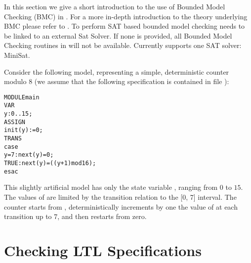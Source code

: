 In this section we give a short introduction to the use of Bounded Model
Checking (BMC) in \nusmv. For a more in-depth 
introduction to the theory underlying BMC please refer to \cite{BCCZ99}.
%
To perform SAT based bounded model checking \nusmv needs to be linked
to an external Sat Solver. If none is provided, all Bounded Model
Checking routines in \nusmv will not be available. Currently
\nusmv supports one SAT solver: MiniSat.


Consider the following model, representing a simple, deterministic
counter modulo $8$ (we assume that the following specification is
contained in file ):
\begin{alltt}
MODULE main
VAR 
  y : 0..15;
ASSIGN 
  init(y) := 0;
TRANS
  case
     y = 7 :  next(y) = 0; 
     TRUE  :  next(y) = ((y + 1) mod 16);
  esac
\end{alltt}

This slightly artificial model has only the state variable , ranging
from $0$ to $15$. The values of  are limited by the transition relation
to the [0, 7] interval. The counter starts from , deterministically
increments by one the value of  at each transition up to $7$, and then
restarts from zero. 

\section{Checking LTL Specifications}
\label{Checking LTL Specifications}


